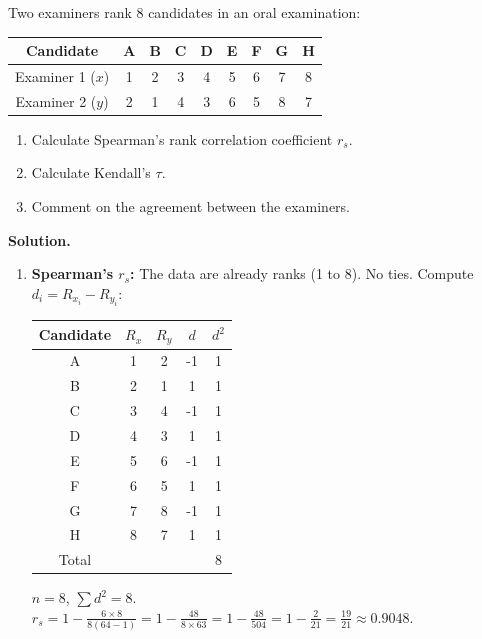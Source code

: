 \documentclass[11pt]{article}
\begin{document}
\begin{exoresolu}
Two examiners rank 8 candidates in an oral examination:

\begin{center}
\begin{tabular}{|c|c|c|c|c|c|c|c|c|}
\hline
Candidate & A & B & C & D & E & F & G & H \\
\hline
Examiner 1 ($x$) & 1 & 2 & 3 & 4 & 5 & 6 & 7 & 8 \\
\hline
Examiner 2 ($y$) & 2 & 1 & 4 & 3 & 6 & 5 & 8 & 7 \\
\hline
\end{tabular}
\end{center}

\begin{enumerate}
\item Calculate Spearman's rank correlation coefficient $r_s$.
\item Calculate Kendall's $\tau$.
\item Comment on the agreement between the examiners.
\end{enumerate}
\tcblower
\textbf{Solution.}

\begin{enumerate}
\item \textbf{Spearman's $r_s$:} The data are already ranks (1 to 8). No ties.
Compute $d_i = R_{x_i} - R_{y_i}$:
\begin{center}
\begin{tabular}{|c|c|c|c|c|}
\hline
Candidate & $R_x$ & $R_y$ & $d$ & $d^2$ \\
\hline
A & 1 & 2 & -1 & 1 \\
B & 2 & 1 & 1 & 1 \\
C & 3 & 4 & -1 & 1 \\
D & 4 & 3 & 1 & 1 \\
E & 5 & 6 & -1 & 1 \\
F & 6 & 5 & 1 & 1 \\
G & 7 & 8 & -1 & 1 \\
H & 8 & 7 & 1 & 1 \\
\hline
Total & & & & 8 \\
\hline
\end{tabular}
\end{center}
$n=8$, $\sum d^2 = 8$.
$r_s = 1 - \frac{6 \times 8}{8(64-1)} = 1 - \frac{48}{8 \times 63} = 1 - \frac{48}{504} = 1 - \frac{2}{21} = \frac{19}{21} \approx 0.9048$.


\end{enumerate}
\end{exoresolu}
\end{document}
